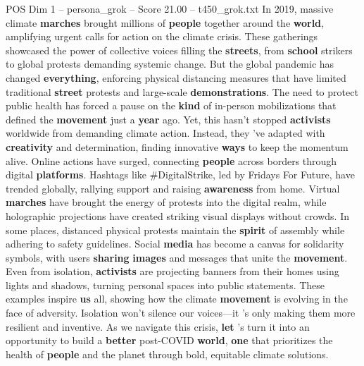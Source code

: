 \begin{textsample}{POS Dim 1 – persona\_grok – Score 21.00 – t450\_grok.txt}  \label{ex:f1_pos_032}
In 2019, massive climate \textbf{marches} brought millions of \textbf{people} together around the \textbf{world}, amplifying urgent calls for action on the climate crisis.
These gatherings showcased the power of collective voices filling the \textbf{streets}, from \textbf{school} strikers to global protests demanding systemic change.
But the global pandemic has changed \textbf{everything}, enforcing physical distancing measures that have limited traditional \textbf{street} protests and large-scale \textbf{demonstrations}.
The need to protect public health has forced a pause on the \textbf{kind} of in-person mobilizations that defined the \textbf{movement} just a \textbf{year} ago.
Yet, this hasn't stopped \textbf{activists} worldwide from demanding climate action.
Instead, they 've adapted with \textbf{creativity} and determination, finding innovative \textbf{ways} to keep the momentum alive.
Online actions have surged, connecting \textbf{people} across borders through digital \textbf{platforms}.
Hashtags like \#DigitalStrike, led by Fridays For Future, have trended globally, rallying support and raising \textbf{awareness} from home.
Virtual \textbf{marches} have brought the energy of protests into the digital realm, while holographic projections have created striking visual displays without crowds.
In some places, distanced physical protests maintain the \textbf{spirit} of assembly while adhering to safety guidelines.
Social \textbf{media} has become a canvas for solidarity symbols, with users \textbf{sharing} \textbf{images} and messages that unite the \textbf{movement}.
Even from isolation, \textbf{activists} are projecting banners from their homes using lights and shadows, turning personal spaces into public statements.
These examples inspire \textbf{us} all, showing how the climate \textbf{movement} is evolving in the face of adversity.
Isolation won't silence our voices—it 's only making them more resilient and inventive.
As we navigate this crisis, \textbf{let} 's turn it into an opportunity to build a \textbf{better} post-COVID \textbf{world}, \textbf{one} that prioritizes the health of \textbf{people} and the planet through bold, equitable climate solutions.

\end{textsample}
